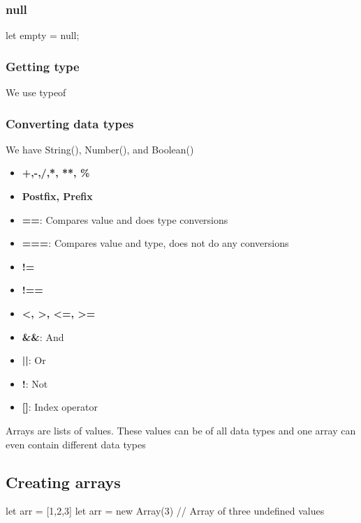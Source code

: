 \documentclass{report}
\begin{document}
    \bigbreak \noindent 
    \subsubsection{null}
    \bigbreak \noindent 
    \begin{jscode}
    let empty = null;
    \end{jscode}

    \bigbreak \noindent 
    \subsubsection{Getting type}
    \bigbreak \noindent 
    We use typeof

    \bigbreak \noindent 
    \subsubsection{Converting data types}
    \bigbreak \noindent 
    We have String(), Number(), and Boolean()

    \pagebreak 
    \begin{itemize}
        \item \textbf{+,-,/,*, **, \%}
        \item \textbf{Postfix, Prefix}
        \item \textbf{==}: Compares value and does type conversions
        \item \textbf{===}: Compares value and type, does not do any conversions
        \item \textbf{!=}
        \item \textbf{!==}
        \item \textbf{<, >, <=, >=}
        \item \textbf{\&\&}: And
        \item \textbf{||}: Or
        \item \textbf{!}: Not
        \item \textbf{[]}: Index operator
    \end{itemize}


    \pagebreak 
    \bigbreak \noindent 
    Arrays are lists of values. These values can be of all data types and one array can even contain different data types
    \bigbreak \noindent 
    \subsection{Creating arrays}
    \bigbreak \noindent 
    \begin{jscode}
        let arr = [1,2,3]
        let arr = new Array(3)  // Array of three undefined values
    \end{jscode}
\end{document}
